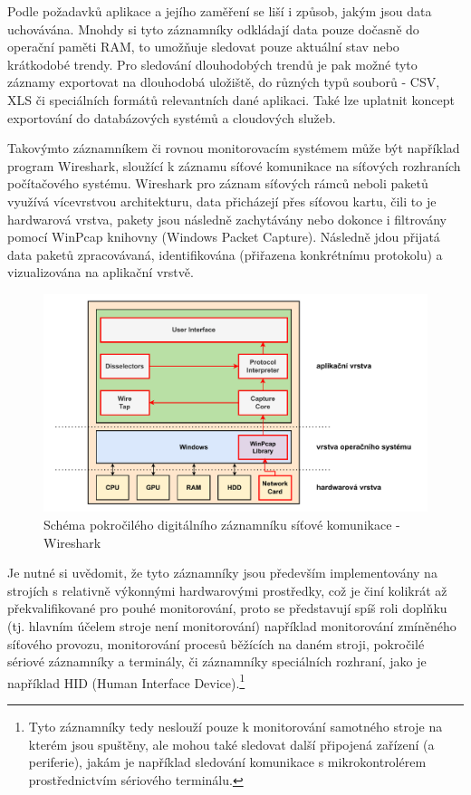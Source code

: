 % 
Podle požadavků aplikace a jejího zaměření se liší i způsob, jakým jsou data uchovávána. Mnohdy si tyto záznamníky odkládají data pouze dočasně do operační paměti RAM, to umožňuje sledovat pouze aktuální stav nebo krátkodobé trendy. Pro sledování dlouhodobých trendů je pak možné tyto záznamy exportovat na dlouhodobá uložiště, do různých typů souborů - CSV, XLS či speciálních formátů relevantních dané aplikaci. Také lze uplatnit koncept exportování do databázových systémů a cloudových služeb.

Takovýmto záznamníkem či rovnou monitorovacím systémem může být například program Wireshark, sloužící k záznamu síťové komunikace na síťových rozhraních počítačového systému. Wireshark pro záznam síťových rámců neboli paketů využívá vícevrstvou architekturu, data přicházejí přes síťovou kartu, čili to je hardwarová vrstva, pakety jsou následně zachytávány nebo dokonce i filtrovány pomocí WinPcap knihovny (Windows Packet Capture). Následně jdou přijatá data paketů zpracovávaná, identifikována (přiřazena konkrétnímu protokolu) a vizualizována na aplikační vrstvě. \cite{researchgate_wireshark_architecture, wireshark_architecture_diagram}

\begin{figure}[h]
    \centering
    \includegraphics[width=1.00\textwidth]{obrazky-figures/wireshark.pdf}
    
    \caption{Schéma pokročilého digitálního záznamníku síťové komunikace - Wireshark \cite{researchgate_wireshark_architecture, winpcap_architecture}}
    \label{fig:computer-recorder}
\end{figure}

Je nutné si uvědomit, že tyto záznamníky jsou především implementovány na strojích s relativně výkonnými hardwarovými prostředky, což je činí kolikrát až překvalifikované pro pouhé monitorování, proto se představují spíš roli doplňku (tj. hlavním účelem stroje není monitorování) například monitorování zmíněného síťového provozu, monitorování procesů běžících na daném stroji, pokročilé sériové záznamníky a terminály, či záznamníky speciálních rozhraní, jako je například HID (Human Interface Device).\footnote{Tyto záznamníky tedy neslouží pouze k monitorování samotného stroje na kterém jsou spuštěny, ale mohou také sledovat další připojená zařízení (a periferie), jakám je například sledování komunikace s mikrokontrolérem prostřednictvím sériového terminálu.}

